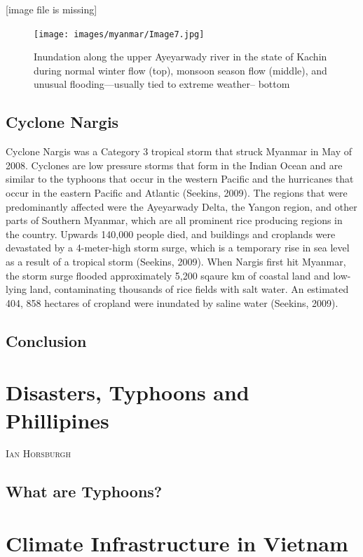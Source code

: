 \documentclass{book}\usepackage{knitr}
\makeatletter
\newcommand{\chapterauthor}[1]{%
  {\parindent0pt\vspace*{-25pt}%
  \linespread{1.1}\large\scshape#1%
  \par\nobreak\vspace*{35pt}}
  \@afterheading%
}
\makeatother
\begin{document}
[image file is missing]
\begin{figure}
\texttt{[image: images/myanmar/Image7.jpg]}
\caption{Inundation along the upper Ayeyarwady river in the state of Kachin during normal winter flow (top), monsoon season flow (middle), and unusual flooding—usually tied to extreme weather-- bottom}
\end{figure}

\section{Cyclone Nargis}
Cyclone Nargis was a Category 3 tropical storm that struck Myanmar in May of 2008. Cyclones are low pressure storms that form in the Indian Ocean and are similar to the typhoons that occur in the western Pacific and the hurricanes that occur in the eastern Pacific and Atlantic (Seekins, 2009). The regions that were predominantly affected were the Ayeyarwady Delta, the Yangon region, and other parts of Southern Myanmar, which are all prominent rice producing regions in the country. Upwards 140,000 people died, and buildings and croplands were devastated by a 4-meter-high storm surge, which is a temporary rise in sea level as a result of a tropical storm (Seekins, 2009). 
	When Nargis first hit Myanmar, the storm surge flooded approximately 5,200 sqaure km of coastal land and low-lying land, contaminating thousands of rice fields with salt water. An estimated 404, 858 hectares of cropland were inundated by saline water (Seekins, 2009). 

\section{Conclusion}




\chapter{Disasters, Typhoons and Phillipines}

\chapterauthor{Ian Horsburgh}

\section{What are Typhoons?}



\chapter{Climate Infrastructure in Vietnam}
\end{document}
